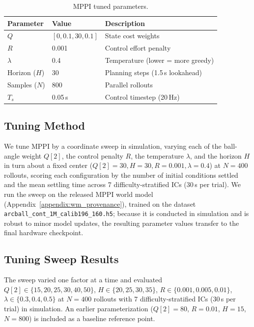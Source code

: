 \begin{table}[!ht]
\centering
\caption{MPPI tuned parameters.}
\label{tab:mppi_params}
\begin{tabular}{lll}
\toprule
\textbf{Parameter} & \textbf{Value} & \textbf{Description} \\
\midrule
$Q$ & $[0, 0.1, 30, 0.1]$ & State cost weights \\
$R$ & 0.001 & Control effort penalty \\
$\lambda$ & 0.4 & Temperature (lower = more greedy) \\
Horizon ($H$) & 30 & Planning steps (1.5\,s lookahead) \\
Samples ($N$) & 800 & Parallel rollouts \\
$T_s$ & 0.05\,s & Control timestep (20\,Hz) \\
\bottomrule
\end{tabular}
\end{table}

\subsection{Tuning Method}

We tune MPPI by a coordinate sweep in simulation, varying each of the ball-angle weight $Q[2]$,
the control penalty $R$, the temperature $\lambda$, and the horizon $H$ in turn about a
fixed center ($Q[2]{=}30, H{=}30, R{=}0.001, \lambda{=}0.4$) at $N=400$ rollouts, scoring each configuration by the number of initial
conditions settled and the mean settling time across 7 difficulty-stratified
ICs (30\,s per trial). We run the sweep on the released MPPI world model
(Appendix~\ref{appendix:wm_provenance}), trained on the dataset
\texttt{arcball\_cont\_1M\_calib196\_160.h5}; because it is conducted in
simulation and is robust to minor model updates, the resulting parameter
values transfer to the final hardware checkpoint.

\subsection{Tuning Sweep Results}

The sweep varied one factor at a time and evaluated $Q[2] \in \{15,20,25,30,40,50\}$,
$H \in \{20,25,30,35\}$, $R \in \{0.001,0.005,0.01\}$,
$\lambda \in \{0.3,0.4,0.5\}$ at $N=400$ rollouts
with 7 difficulty-stratified ICs (30\,s per trial) in simulation.
An earlier parameterization ($Q[2]=80$, $R=0.01$, $H=15$, $N=800$) is
included as a baseline reference point.

